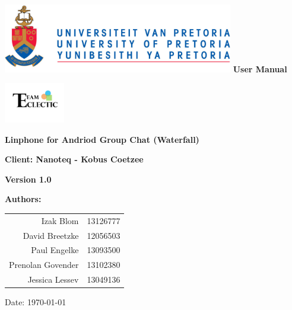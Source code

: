 \begin{titlepage}
\begin{flushright}

\includegraphics[width=380px]{../global/University_of_Pretoria_Logo.png}
\newline
\newline
\textbf {\LARGE User Manual} \newline


\centering\includegraphics[width=100px]{../global/Logo.jpg}

\begin{flushleft}
\textbf {\Large Linphone for Andriod Group Chat (Waterfall)}\newline

\textbf {\Large Client: Nanoteq - Kobus Coetzee}\newline


\textbf {\large Version 1.0}\newline
\end{flushleft}
\centering \textbf {\large Authors:}

\begin{table}[H]
\large
\centering
\begin{tabular}{rl}
	Izak Blom & 13126777 \\
	David Breetzke & 12056503 \\
	Paul Engelke & 13093500 \\
	Prenolan Govender & 13102380 \\
	Jessica Lessev & 13049136 \\
\end{tabular}
\end{table}

Date: \today

\end{flushright}
\end{titlepage}
